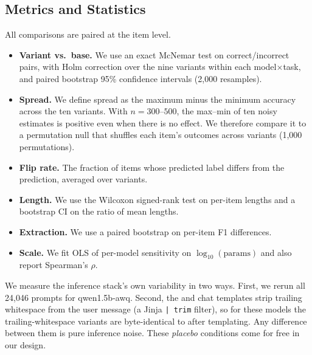 \subsection{Metrics and Statistics}

All comparisons are paired at the item level.
\begin{itemize}[leftmargin=*,itemsep=0pt,topsep=0pt]
    \item {\bf Variant vs.\ base.} We use an exact McNemar test on correct/incorrect pairs, with Holm correction over the nine variants within each model$\times$task, and paired bootstrap 95\% confidence intervals (2{,}000 resamples).
    \item {\bf Spread.} We define spread as the maximum minus the minimum accuracy across the ten variants. With $n{=}300$--$500$, the max--min of ten noisy estimates is positive even when there is no effect. We therefore compare it to a permutation null that shuffles each item's outcomes across variants (1{,}000 permutations).
    \item {\bf Flip rate.} The fraction of items whose predicted label differs from the  prediction, averaged over variants.
    \item {\bf Length.} We use the Wilcoxon signed-rank test on per-item lengths and a bootstrap CI on the ratio of mean lengths.
    \item {\bf Extraction.} We use a paired bootstrap on per-item F1 differences.
    \item {\bf Scale.} We fit OLS of per-model sensitivity on $\log_{10}(\text{params})$ and also report Spearman's $\rho$.
\end{itemize}

 We measure the inference stack's own variability in two ways. First, we rerun all 24{,}046 prompts for qwen1.5b-awq. Second, the \llama and \gemma chat templates strip trailing whitespace from the user message (a Jinja \texttt{|~trim} filter), so for these models the trailing-whitespace variants are byte-identical to  after templating. Any difference between them is pure inference noise. These \emph{placebo} conditions come for free in our design.
